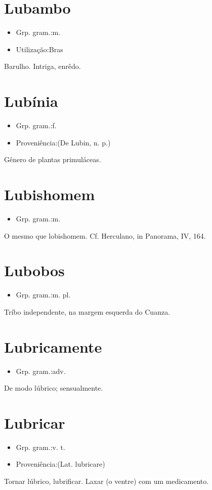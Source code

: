\section{Lubambo}
\begin{itemize}
\item {Grp. gram.:m.}
\end{itemize}
\begin{itemize}
\item {Utilização:Bras}
\end{itemize}
Barulho.
Intriga, enrêdo.
\section{Lubínia}
\begin{itemize}
\item {Grp. gram.:f.}
\end{itemize}
\begin{itemize}
\item {Proveniência:(De \textunderscore Lubin\textunderscore , n. p.)}
\end{itemize}
Gênero de plantas primuláceas.
\section{Lubishomem}
\begin{itemize}
\item {Grp. gram.:m.}
\end{itemize}
O mesmo que \textunderscore lobishomem\textunderscore . Cf. Herculano, in \textunderscore Panorama\textunderscore , IV, 164.
\section{Lubobos}
\begin{itemize}
\item {Grp. gram.:m. pl.}
\end{itemize}
Tríbo independente, na margem esquerda do Cuanza.
\section{Lubricamente}
\begin{itemize}
\item {Grp. gram.:adv.}
\end{itemize}
De modo lúbrico; sensualmente.
\section{Lubricar}
\begin{itemize}
\item {Grp. gram.:v. t.}
\end{itemize}
\begin{itemize}
\item {Proveniência:(Lat. \textunderscore lubricare\textunderscore )}
\end{itemize}
Tornar lúbrico, lubrificar.
Laxar (o ventre) com um medicamento.
